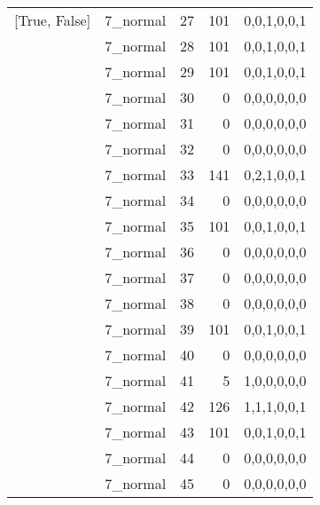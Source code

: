 \begin{tabular}{llrrl}
 [True, False]   & 7\_normal            &            27 &                   101 & 0,0,1,0,0,1   \\
 [True, False]   & 7\_normal            &            28 &                   101 & 0,0,1,0,0,1   \\
 [True, False]   & 7\_normal            &            29 &                   101 & 0,0,1,0,0,1   \\
 [True, False]   & 7\_normal            &            30 &                     0 & 0,0,0,0,0,0   \\
 [True, False]   & 7\_normal            &            31 &                     0 & 0,0,0,0,0,0   \\
 [True, False]   & 7\_normal            &            32 &                     0 & 0,0,0,0,0,0   \\
 [True, False]   & 7\_normal            &            33 &                   141 & 0,2,1,0,0,1   \\
 [True, False]   & 7\_normal            &            34 &                     0 & 0,0,0,0,0,0   \\
 [True, False]   & 7\_normal            &            35 &                   101 & 0,0,1,0,0,1   \\
 [True, False]   & 7\_normal            &            36 &                     0 & 0,0,0,0,0,0   \\
 [True, False]   & 7\_normal            &            37 &                     0 & 0,0,0,0,0,0   \\
 [True, False]   & 7\_normal            &            38 &                     0 & 0,0,0,0,0,0   \\
 [True, False]   & 7\_normal            &            39 &                   101 & 0,0,1,0,0,1   \\
 [True, False]   & 7\_normal            &            40 &                     0 & 0,0,0,0,0,0   \\
 [True, False]   & 7\_normal            &            41 &                     5 & 1,0,0,0,0,0   \\
 [True, False]   & 7\_normal            &            42 &                   126 & 1,1,1,0,0,1   \\
 [True, False]   & 7\_normal            &            43 &                   101 & 0,0,1,0,0,1   \\
 [True, False]   & 7\_normal            &            44 &                     0 & 0,0,0,0,0,0   \\
 [True, False]   & 7\_normal            &            45 &                     0 & 0,0,0,0,0,0   \\

\end{tabular}
